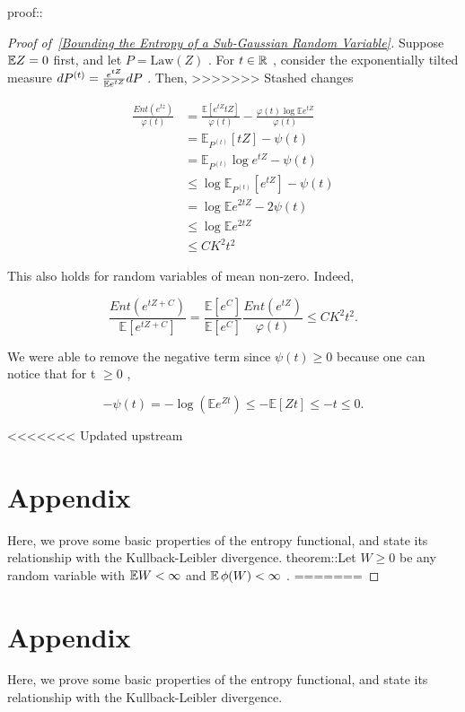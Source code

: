 \documentclass{article}
\begin{document}
proof::
\begin{proof}[Proof of~{\autoref{Bounding the Entropy of a Sub-Gaussian Random Variable}}]
\label{proof:Bounding the Entropy of a Sub-Gaussian Random Variable}
Suppose  $\mathbb{E} Z = 0$  first, and let  $P = \mathrm{Law}(Z)$ . For  $t\in \mathbb{R}$ , consider the exponentially tilted measure  $dP^{(t)} = \frac{e^{tZ}}{\mathbb{E} e^{tZ}} dP$ . Then,
>>>>>>> Stashed changes


\begin{align*}
\frac{Ent(e^{tz})}{\varphi(t)} &= \frac{\mathbb{E}[e^{tZ}tZ]}{\varphi(t)} - \frac{\varphi(t)\log \mathbb{E}e^{tZ}}{\varphi(t)} \\
& = \mathbb{E}_{P^{(t)}}[tZ] - \psi(t) \\
& = \mathbb{E}_{P^{(t)}} \log e^{tZ} - \psi(t) \\
& \leq \log \mathbb{E}_{P^{(t)}} [e^{tZ}] - \psi(t) \\
& = \log \mathbb{E} e^{2tZ} - 2 \psi(t) \\
& \leq \log \mathbb{E} e^{2tZ} \\
& \leq CK^2t^2
\end{align*}

This also holds for random variables of mean non-zero. Indeed,


\begin{equation*}
\frac{Ent(e^{tZ + C})}{\mathbb{E}[e^{tZ + C}]} = \frac{\mathbb{E}[e^C]}{\mathbb{E}[e^C]} \frac{Ent(e^{tZ})}{\varphi(t)} \leq CK^2t^2.
\end{equation*}

We were able to remove the negative term since  $\psi(t) \geq 0$  because one can notice that for t  $\geq 0$ ,


\begin{equation*}
-\psi(t) = -\log(\mathbb{E}e^{Zt}) \leq - \mathbb{E}[Zt] \leq -t \leq 0.
\end{equation*}


<<<<<<< Updated upstream

\section{Appendix}
\label{section:Appendix}
Here, we prove some basic properties of the entropy functional, and state its relationship with the Kullback-Leibler divergence. theorem::Let  $W\geq 0$  be any random variable with  $\mathbb{E} W < \infty$  and  $\mathbb{E}\, \phi(W)<\infty$ . 
=======
\end{proof}


\section{Appendix}
\label{section:Appendix}
Here, we prove some basic properties of the entropy functional, and state its relationship with the Kullback-Leibler divergence.
\end{document}
